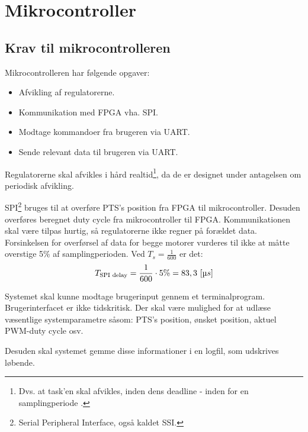 \section{Mikrocontroller}
\label{sec:mikrocontroller}
%
\subsection{Krav til mikrocontrolleren}
Mikrocontrolleren har følgende opgaver: 

\begin{itemize}
\itemsep1pt
	\item Afvikling af regulatorerne.
	\item Kommunikation med FPGA vha. SPI.
	\item Modtage kommandoer fra brugeren via UART.
	\item Sende relevant data til brugeren via UART.
\end{itemize}

Regulatorerne skal afvikles i hård realtid\footnote{Dvs. at task'en skal afvikles, inden dens deadline - inden for en samplingperiode \citep{operating_systems_concepts_ed8}.},
da de er designet under antagelsen om periodisk afvikling.

SPI\footnote{Serial Peripheral Interface, også kaldet SSI.} bruges til at overføre PTS's position fra FPGA til mikrocontroller.
Desuden overføres beregnet duty cycle fra mikrocontroller til FPGA.
Kommunikationen skal være tilpas hurtig, så regulatorerne ikke regner på forældet data.
Forsinkelsen for overførsel af data for begge motorer vurderes til ikke at måtte overstige 5\% af samplingperioden.
Ved $T_s = \frac{1}{600}$ er det: 
\begin{equation}
	T_{\text{SPI delay}} = \frac{1}{600} \cdot 5 \% = 83,3~[\micro s]
	\label{eq:uc:spi-krav}
\end{equation}

Systemet skal kunne modtage brugerinput gennem et terminalprogram.
Brugerinterfacet er ikke tidskritisk.
Der skal være mulighed for at udlæse væsentlige systemparametre såsom:
PTS's position, ønsket position, aktuel PWM-duty cycle osv.

Desuden skal systemet gemme disse informationer i en logfil,
som udskrives løbende.

